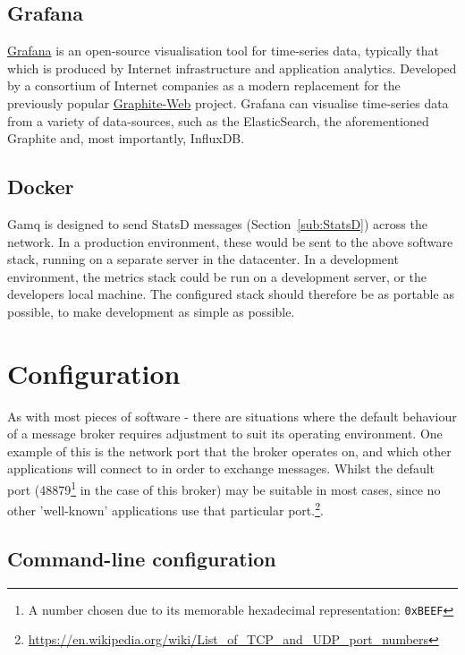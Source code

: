 \subsection{Grafana}
\label{sub:Grafana}

\href{http://grafana.org/}{Grafana} is an open-source visualisation tool for
\gls{time-series data}, typically that which is produced by Internet
infrastructure and application analytics. Developed by a consortium of Internet
companies as a modern replacement for the previously popular
\href{https://github.com/graphite-project/graphite-web}{Graphite-Web} project.
Grafana can visualise \gls{time-series data} from a variety of data-sources,
such as the ElasticSearch, the aforementioned Graphite and, most importantly,
InfluxDB.


\subsection{Docker}
\label{sub:Docker}

Gamq is designed to send StatsD messages (Section~\ref{sub:StatsD}) across the
network. In a production environment, these would be sent to the above software
stack, running on a separate server in the datacenter. In a development
environment, the metrics stack could be run on a development server, or the
developers local machine. The configured stack should therefore be as portable
as possible, to make development as simple as possible. 

\section{Configuration}
\label{sec:Configuration}

As with most pieces of software - there are situations where the default
behaviour of a message broker requires adjustment to suit its operating
environment. One example of this is the network port that the broker operates
on, and which other applications will connect to in order to exchange messages.
Whilst the default port (48879\footnote{A number chosen due to its memorable
hexadecimal representation: \texttt{0xBEEF}} in the case of this broker) may be
suitable in most cases, since no other 'well-known' applications use that
particular
port.\footnote{\url{https://en.wikipedia.org/wiki/List_of_TCP_and_UDP_port_numbers}}.

\subsection{Command-line configuration}
\label{sub:Command-line configuration}

